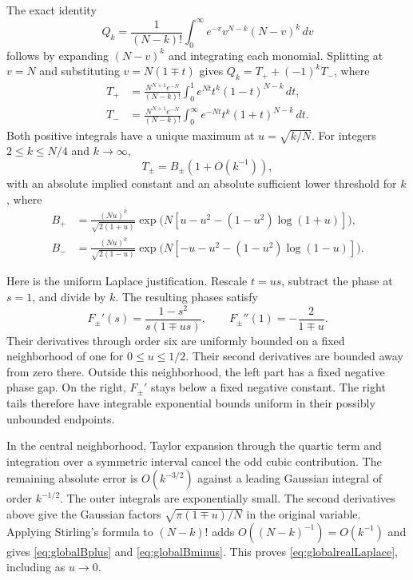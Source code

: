 The exact identity
\begin{equation}\label{eq:globalrealintegral}
Q_k=\frac1{(N-k)!}\int_0^\infty e^{-v}v^{N-k}(N-v)^k\,dv
\end{equation}
follows by expanding $(N-v)^k$ and integrating each monomial. Splitting at $v=N$ and substituting $v=N(1\mp t)$ gives $Q_k=T_++(-1)^kT_-$, where
\begin{align*}
T_+&=\frac{N^{N+1}e^{-N}}{(N-k)!}
\int_0^1e^{Nt}t^k(1-t)^{N-k}\,dt,\\
T_-&=\frac{N^{N+1}e^{-N}}{(N-k)!}
\int_0^\infty e^{-Nt}t^k(1+t)^{N-k}\,dt.
\end{align*}
Both positive integrals have a unique maximum at $u=\sqrt{k/N}$. For integers $2\le k\le N/4$ and $k\to\infty$,
\begin{equation}\label{eq:globalrealLaplace}
T_\pm=B_\pm(1+O(k^{-1})),
\end{equation}
with an absolute implied constant and an absolute sufficient lower threshold for $k$, where
\begin{align}
B_+&=\frac{(Nu)^k}{\sqrt{2(1+u)}}
\exp\bigl(N[u-u^2-(1-u^2)\log(1+u)]\bigr),\label{eq:globalBplus}\\
B_-&=\frac{(Nu)^k}{\sqrt{2(1-u)}}
\exp\bigl(N[-u-u^2-(1-u^2)\log(1-u)]\bigr).\label{eq:globalBminus}
\end{align}

Here is the uniform Laplace justification. Rescale $t=us$, subtract the phase at $s=1$, and divide by $k$. The resulting phases satisfy
\[
F_\pm'(s)=\frac{1-s^2}{s(1\mp us)},\qquad
F_\pm''(1)=-\frac2{1\mp u}.
\]
Their derivatives through order six are uniformly bounded on a fixed neighborhood of one for $0\le u\le1/2$. Their second derivatives are bounded away from zero there. Outside this neighborhood, the left part has a fixed negative phase gap. On the right, $F_\pm'$ stays below a fixed negative constant. The right tails therefore have integrable exponential bounds uniform in their possibly unbounded endpoints.

In the central neighborhood, Taylor expansion through the quartic term and integration over a symmetric interval cancel the odd cubic contribution. The remaining absolute error is $O(k^{-3/2})$ against a leading Gaussian integral of order $k^{-1/2}$. The outer integrals are exponentially small. The second derivatives above give the Gaussian factors $\sqrt{\pi(1\mp u)/N}$ in the original variable. Applying Stirling's formula to $(N-k)!$ adds $O((N-k)^{-1})=O(k^{-1})$ and gives \eqref{eq:globalBplus} and \eqref{eq:globalBminus}. This proves \eqref{eq:globalrealLaplace}, including as $u\to0$.

